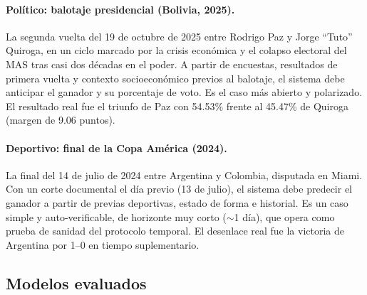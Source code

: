 \documentclass[11pt]{article}
\begin{document}
\paragraph{Político: balotaje presidencial (Bolivia, 2025).} La segunda vuelta del 19 de octubre de 2025 entre Rodrigo Paz y Jorge ``Tuto'' Quiroga, en un ciclo marcado por la crisis económica y el colapso electoral del MAS tras casi dos décadas en el poder. A partir de encuestas, resultados de primera vuelta y contexto socioeconómico previos al balotaje, el sistema debe anticipar el ganador y su porcentaje de voto. Es el caso más abierto y polarizado. El resultado real fue el triunfo de Paz con 54.53\% frente al 45.47\% de Quiroga (margen de 9.06 puntos).

\paragraph{Deportivo: final de la Copa América (2024).} La final del 14 de julio de 2024 entre Argentina y Colombia, disputada en Miami. Con un corte documental el día previo (13 de julio), el sistema debe predecir el ganador a partir de previas deportivas, estado de forma e historial. Es un caso simple y auto-verificable, de horizonte muy corto ($\sim$1 día), que opera como prueba de sanidad del protocolo temporal. El desenlace real fue la victoria de Argentina por 1--0 en tiempo suplementario.

\begin{table}[h]
\centering
\small
{}
\caption{Los tres casos del \textit{benchmark}: inflación mensual (INDEC), balotaje presidencial (Paz vs.\ Quiroga) y la final Argentina--Colombia. En todos, el evento es posterior al corte documental y el \textit{ground truth} se mantiene aislado del input.}
\label{tab:casos}
\end{table}

\subsection{Modelos evaluados}
\end{document}
